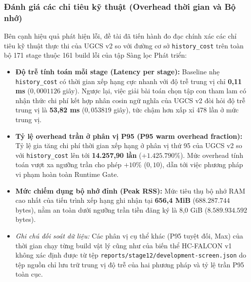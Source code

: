 \subsubsection{Đánh giá các chỉ tiêu kỹ thuật (Overhead thời gian và Bộ nhớ)}
\label{subsubsec:engineering_metrics}

Bên cạnh hiệu quả phát hiện lỗi, đề tài đã tiến hành đo đạc chính xác các chỉ tiêu kỹ thuật thực thi của UGCS v2 so với đường cơ sở \texttt{history\_cost} trên toàn bộ 171 stage thuộc 161 build lỗi của tập Sàng lọc Phát triển:
\begin{itemize}
    \item \textbf{Độ trễ tính toán mỗi stage (Latency per stage):} Baseline nhẹ \texttt{history\_cost} có thời gian xếp hạng cực nhanh với độ trễ trung vị chỉ \textbf{0,11 ms} ($0,0001126$ giây). Ngược lại, việc giải bài toán chọn tập con tham lam có nhận thức chi phí kết hợp nhân cosin ngữ nghĩa của UGCS v2 đòi hỏi độ trễ trung vị là \textbf{53,82 ms} ($0,053819$ giây), tức chậm hơn xấp xỉ 478 lần ở mức trung vị.
    \item \textbf{Tỷ lệ overhead trần ở phân vị P95 (P95 warm overhead fraction):} Tỷ lệ gia tăng chi phí thời gian xếp hạng ở phân vị thứ 95 của UGCS v2 so với \texttt{history\_cost} lên tới \textbf{14.257,90 lần} ($+1.425.790\%$). Mức overhead tính toán vượt xa ngưỡng trần cho phép $+10\%$ ($0,10$), dẫn tới việc phương pháp vi phạm hoàn toàn Runtime Gate.
    \item \textbf{Mức chiếm dụng bộ nhớ đỉnh (Peak RSS):} Mức tiêu thụ bộ nhớ RAM cao nhất của tiến trình xếp hạng ghi nhận tại \textbf{656,4 MiB} ($688.287.744$ bytes), nằm an toàn dưới ngưỡng trần tiền đăng ký là 8,0 GiB ($8.589.934.592$ bytes).
    \item \textit{Ghi chú đối soát dữ liệu:} Các phân vị cụ thể khác (P95 tuyệt đối, Max) của thời gian chạy từng build vật lý cũng như của biến thể HC-FALCON v1 không xác định được từ tệp \texttt{reports/stage12/development-screen.json} do tệp nguồn chỉ lưu trữ trung vị độ trễ của hai phương pháp và tỷ lệ trần P95 toàn cục.
\end{itemize}

